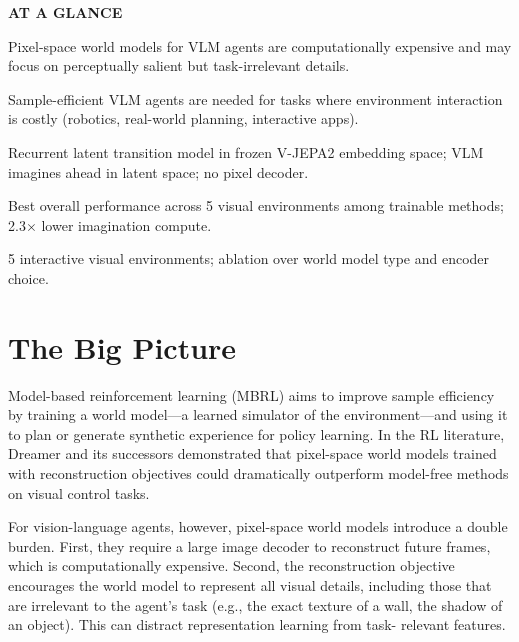 \documentclass[10pt,twocolumn]{article}
\begin{document}
\begin{mdframed}[backgroundcolor=boxgray,linecolor=rulered,linewidth=1pt,
    innerleftmargin=6pt,innerrightmargin=6pt,
    innertopmargin=6pt,innerbottommargin=6pt]
\textbf{\small AT A GLANCE}\par\vspace{4pt}
\begin{description}[leftmargin=0pt,labelsep=4pt,itemsep=2pt,parsep=0pt,
    font=\small\bfseries]
  \item[Problem:] Pixel-space world models for VLM agents are
    computationally expensive and may focus on perceptually salient
    but task-irrelevant details.
  \item[Why it matters:] Sample-efficient VLM agents are needed for
    tasks where environment interaction is costly (robotics, real-world
    planning, interactive apps).
  \item[Method:] Recurrent latent transition model in frozen V-JEPA2
    embedding space; VLM imagines ahead in latent space; no pixel
    decoder.
  \item[Result:] Best overall performance across 5 visual environments
    among trainable methods; 2.3$\times$ lower imagination compute.
  \item[Evidence:] 5 interactive visual environments; ablation over
    world model type and encoder choice.
\end{description}
\end{mdframed}

\section{The Big Picture}

Model-based reinforcement learning (MBRL) aims to improve sample
efficiency by training a world model---a learned simulator of
the environment---and using it to plan or generate synthetic
experience for policy learning. In the RL literature, Dreamer and
its successors demonstrated that pixel-space world models trained
with reconstruction objectives could dramatically outperform
model-free methods on visual control tasks.

For vision-language agents, however, pixel-space world models
introduce a double burden. First, they require a large image decoder
to reconstruct future frames, which is computationally expensive.
Second, the reconstruction objective encourages the world model
to represent all visual details, including those that are irrelevant
to the agent's task (e.g., the exact texture of a wall, the shadow
of an object). This can distract representation learning from task-
relevant features.
\end{document}
